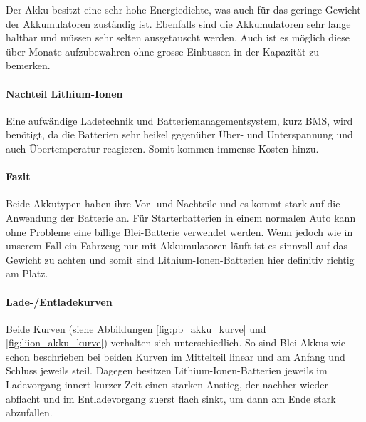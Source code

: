 Der Akku besitzt eine sehr hohe Energiedichte, was auch für das geringe Gewicht der Akkumulatoren zuständig ist. Ebenfalls sind die Akkumulatoren sehr lange haltbar und müssen sehr selten ausgetauscht werden. Auch ist es möglich diese über Monate aufzubewahren ohne grosse Einbussen in der Kapazität zu bemerken.

\paragraph{Nachteil Lithium-Ionen}

Eine aufwändige Ladetechnik und Batteriemanagementsystem, kurz BMS, wird benötigt, da die Batterien sehr heikel gegenüber Über- und Unterspannung und auch Übertemperatur reagieren. Somit kommen immense Kosten hinzu.

\paragraph{Fazit}

Beide Akkutypen haben ihre Vor- und Nachteile und es kommt stark auf die Anwendung der Batterie an. Für Starterbatterien in einem normalen Auto kann ohne Probleme eine billige Blei-Batterie verwendet werden. Wenn jedoch wie in unserem Fall ein Fahrzeug nur mit Akkumulatoren läuft ist es sinnvoll auf das Gewicht zu achten und somit sind Lithium-Ionen-Batterien hier definitiv richtig am Platz.

\paragraph{Lade-/Entladekurven}

Beide Kurven (siehe Abbildungen \ref{fig:pb_akku_kurve} und \ref{fig:liion_akku_kurve}) verhalten sich unterschiedlich. So sind Blei-Akkus wie schon beschrieben bei beiden Kurven im Mittelteil linear und am Anfang und Schluss jeweils steil. Dagegen besitzen Lithium-Ionen-Batterien jeweils im Ladevorgang innert kurzer Zeit einen starken Anstieg, der nachher wieder abflacht und im Entladevorgang zuerst flach sinkt, um dann am Ende stark abzufallen.